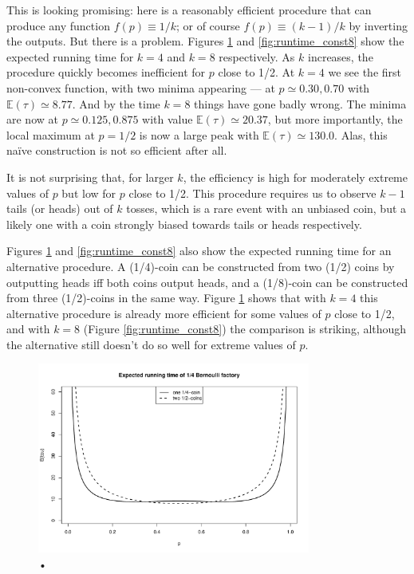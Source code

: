 \documentclass{article}
\theoremstyle{definition}
\newcommand{\E}{\mathbb{E}}
\begin{document}
This is looking promising: here is a reasonably efficient procedure that can produce any function $f(p)\equiv 1/k$; or of course $f(p)\equiv (k-1)/k$ by inverting the outputs.
But there is a problem. Figures \ref{fig:runtime_const4} and \ref{fig:runtime_const8} show the expected running time for $k=4$ and $k=8$ respectively. As $k$ increases, the procedure quickly becomes inefficient for $p$ close to 1/2. At $k=4$ we see the first non-convex function, with two minima appearing --- at $p \simeq 0.30, 0.70$ with $\E(\tau) \simeq 8.77$. And by the time $k=8$ things have gone badly wrong. The minima are now at $p\simeq 0.125, 0.875$ with value $\E(\tau) \simeq 20.37$, but more importantly, the local maximum at $p=1/2$ is now a large peak with $\E(\tau) \simeq 130.0$. Alas, this na\"ive construction is not so efficient after all.

It is not surprising that, for larger $k$, the efficiency is high for moderately extreme values of $p$ but low for $p$ close to 1/2. This procedure requires us to observe $k-1$ tails (or heads) out of $k$ tosses, which is a rare event with an unbiased coin, but a likely one with a coin strongly biased towards tails or heads respectively.

Figures \ref{fig:runtime_const4} and \ref{fig:runtime_const8} also show the expected running time for an alternative procedure. A (1/4)-coin can be constructed from two (1/2) coins by outputting heads iff both coins output heads, and a (1/8)-coin can be constructed from three (1/2)-coins in the same way. Figure \ref{fig:runtime_const4} shows that with $k=4$ this alternative procedure is already more efficient for some values of $p$ close to 1/2, and with $k=8$ (Figure \ref{fig:runtime_const8}) the comparison is striking, although the alternative still doesn't do so well for extreme values of $p$.

\begin{figure}
\centering
\includegraphics[width=0.8\textwidth]{const4_runtime.pdf}
\caption{•}
\label{fig:runtime_const4}
\end{figure}
\end{document}

